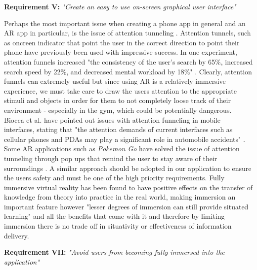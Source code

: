 \documentclass{l4proj}
\begin{document}
\textbf{Requirement V:} \textit{"Create an easy to use on-screen graphical user interface"}   \label{requirement_V}


Perhaps the most important issue when creating a phone app in general and an AR app in particular, is the issue of attention tunneling \cite{radu_why_2012} \cite{biocca_attention_2007}. Attention tunnels, such as oncreen indicator that point the user in the correct direction to point their phone have previously been used with impressive success\cite{biocca_attention_2007}. In one experiment, attention funnels increased "the consistency of the user’s search by 65\%,  increased search speed by 22\%, and decreased mental workload by 18\%" \cite{biocca_attention_2007}. Clearly, attention funnels can extremely useful but since using AR is a relatively immersive experience, we must take care to draw the users attention to the appropriate stimuli and objects in order for them to not completely loose track of their environment - especially in the gym, which could be potentially dangerous. Biocca et al. have pointed out issues with attention funneling in mobile interfaces, stating that "the attention demands of current interfaces such as cellular phones and PDAs may play a significant role in automobile accidents" \cite{biocca_attention_2006}. Some AR applications such as \textit{Pokemon Go} have solved the issue of attention tunneling through pop ups that remind the user to stay aware of their surroundings \cite{hollister_drivers_2016}. A similar approach should be adopted in our application to ensure the users safety and must be one of the high priority requirements. Fully immersive virtual reality has been found to have positive effects on the transfer of knowledge from theory into practice in the real world\cite{dede_immersive_2009}, making immersion an important feature however "lesser degrees of immersion can still provide situated learning" and all the benefits that come with it\cite{dede_immersive_2009} and therefore by limiting immersion there is no trade off in situativity or effectiveness of information delivery.

\textbf{Requirement VII:} \textit{"Avoid users from becoming fully immersed into the application"}  \label{requirement_VI}
\end{document}
